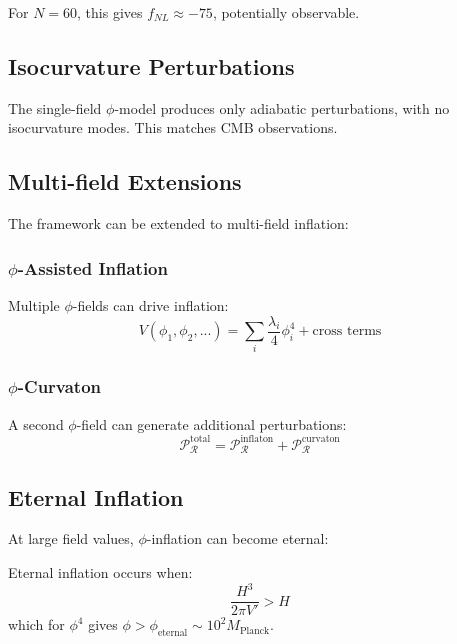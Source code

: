 For $N = 60$, this gives $f_{NL} \approx -75$, potentially observable.

\subsection{Isocurvature Perturbations}

The single-field $\phi$-model produces only adiabatic perturbations, with no isocurvature modes. This matches CMB observations.

\subsection{Multi-field Extensions}

The framework can be extended to multi-field inflation:

\subsubsection{$\phi$-Assisted Inflation}

Multiple $\phi$-fields can drive inflation:
\begin{equation}
V(\phi_1, \phi_2, ...) = \sum_i \frac{\lambda_i}{4} \phi_i^4 + \text{cross terms}
\end{equation}

\subsubsection{$\phi$-Curvaton}

A second $\phi$-field can generate additional perturbations:
\begin{equation}
\mathcal{P}_\mathcal{R}^{\text{total}} = \mathcal{P}_\mathcal{R}^{\text{inflaton}} + \mathcal{P}_\mathcal{R}^{\text{curvaton}}
\end{equation}

\subsection{Eternal Inflation}

At large field values, $\phi$-inflation can become eternal:

\begin{theorem}
Eternal inflation occurs when:
\begin{equation}
\frac{H^3}{2\pi V'} > H
\end{equation}
which for $\phi^4$ gives $\phi > \phi_{\text{eternal}} \sim 10^2 M_{\text{Planck}}$.
\end{theorem}

